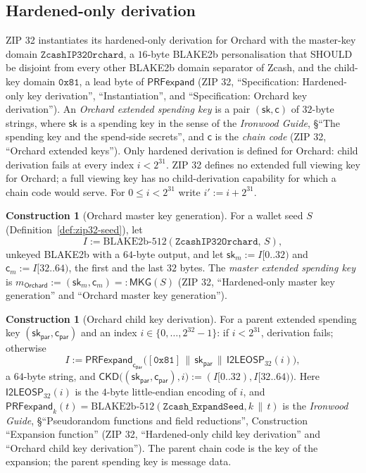 \documentclass[11pt,a4paper]{article}
\theoremstyle{definition}
\newtheorem{construction}[theorem]{Construction}
\begin{document}
\subsection{Hardened-only derivation}\label{sec:zip32-hardened}

ZIP 32 instantiates its hardened-only derivation for Orchard with the
master-key domain $\texttt{ZcashIP32Orchard}$, a $16$-byte BLAKE2b
personalisation that SHOULD be disjoint from every other BLAKE2b domain
separator of Zcash, and the child-key domain $\mathtt{0x81}$, a lead byte
of $\mathsf{PRFexpand}$ (ZIP 32, ``Specification: Hardened-only key
derivation'', ``Instantiation'', and ``Specification: Orchard key
derivation''). An \emph{Orchard extended spending key} is a pair
$(\mathsf{sk}, \mathsf{c})$ of $32$-byte strings, where $\mathsf{sk}$ is a
spending key in the sense of the \emph{Ironwood Guide}, \S``The spending
key and the spend-side secrets'', and $\mathsf{c}$ is the \emph{chain code}
(ZIP 32, ``Orchard extended keys''). Only hardened derivation is defined for
Orchard: child derivation fails at every index $i < 2^{31}$. ZIP 32 defines
no extended full viewing key for Orchard; a full viewing key has no
child-derivation capability for which a chain code would serve. For
$0 \le i < 2^{31}$ write $i' := i + 2^{31}$.

\begin{construction}[Orchard master key generation]\label{def:zip32-mkg}
For a wallet seed $S$ (Definition~\ref{def:zip32-seed}), let
\[
  I := \mathrm{BLAKE2b\text{-}512}(\texttt{ZcashIP32Orchard},\, S),
\]
unkeyed BLAKE2b with a $64$-byte output, and let
$\mathsf{sk}_m := I[0..32)$ and $\mathsf{c}_m := I[32..64)$, the first and
the last $32$ bytes. The \emph{master extended spending key} is
$m_{\mathsf{Orchard}} := (\mathsf{sk}_m, \mathsf{c}_m) =: \mathsf{MKG}(S)$
(ZIP 32, ``Hardened-only master key generation'' and ``Orchard master key
generation'').
\end{construction}

\begin{construction}[Orchard child key derivation]\label{def:zip32-ckd}
For a parent extended spending key $(\mathsf{sk}_{\mathsf{par}},
\mathsf{c}_{\mathsf{par}})$ and an index $i \in \{0, \dots, 2^{32} - 1\}$:
if $i < 2^{31}$, derivation fails; otherwise
\[
  I := \mathsf{PRFexpand}_{\mathsf{c}_{\mathsf{par}}}\bigl(
    [\mathtt{0x81}] \,\|\, \mathsf{sk}_{\mathsf{par}} \,\|\,
    \mathsf{I2LEOSP}_{32}(i)\bigr),
\]
a $64$-byte string, and
$\mathsf{CKD}\bigl((\mathsf{sk}_{\mathsf{par}}, \mathsf{c}_{\mathsf{par}}),
i\bigr) := (I[0..32), I[32..64))$. Here $\mathsf{I2LEOSP}_{32}(i)$ is the
$4$-byte little-endian encoding of $i$, and $\mathsf{PRFexpand}_k(t) =
\mathrm{BLAKE2b\text{-}512}(\texttt{Zcash\_ExpandSeed}, k \,\|\, t)$ is the
\emph{Ironwood Guide}, \S``Pseudorandom functions and field reductions'',
Construction ``Expansion function'' (ZIP 32, ``Hardened-only child key
derivation'' and ``Orchard child key derivation''). The parent chain code is
the key of the expansion; the parent spending key is message data.
\end{construction}
\end{document}
